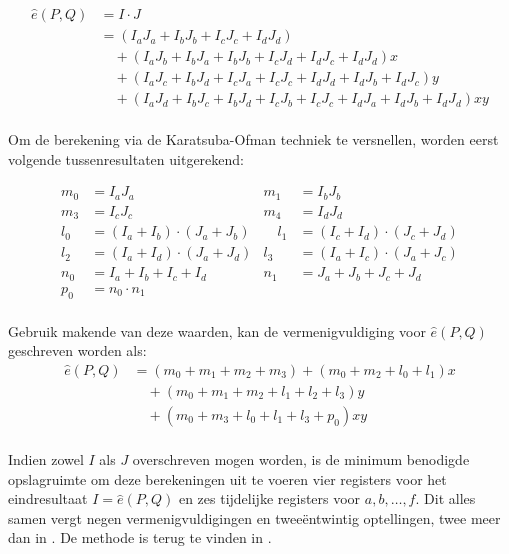 \[\begin{aligned}
\hat{e}(P, Q)	&= I \cdot J\\
	&= (I_a J_a + I_b J_b + I_c J_c + I_d J_d)\\
	&\quad + (I_a J_b + I_b J_a + I_b J_b + I_c J_d + I_d J_c + I_d J_d)x\\
	&\quad + (I_a J_c + I_b J_d + I_c J_a + I_c J_c + I_d J_d + I_d J_b + I_d J_c)y\\
	&\quad + (I_a J_d + I_b J_c + I_b J_d + I_c J_b + I_c J_c + I_d J_a + I_d J_b + I_d J_d)xy\\
\end{aligned}\]

Om de berekening via de Karatsuba-Ofman techniek te versnellen, worden eerst volgende tussenresultaten uitgerekend:

\[\begin{aligned}
m_0	&= I_a J_a
	&m_1	&= I_b J_b\\
m_3	&= I_c J_c
	&m_4	&= I_d J_d\\
l_0	&= (I_a + I_b) \cdot (J_a + J_b)
	&\quad l_1	&= (I_c + I_d) \cdot (J_c + J_d)\\
l_2	&= (I_a + I_d) \cdot (J_a + J_d)
	&l_3	&= (I_a + I_c) \cdot (J_a + J_c)\\
n_0	&= I_a + I_b + I_c + I_d
	&n_1	&= J_a + J_b + J_c + J_d\\
p_0	&= n_0 \cdot n_1\\
\end{aligned}\]

Gebruik makende van deze waarden, kan de vermenigvuldiging voor $\hat{e}(P, Q)$ geschreven worden als:
\[\begin{aligned}
\hat{e}(P, Q)	&= (m_0 + m_1 + m_2 + m_3) + (m_0 + m_2 + l_0 + l_1)x\\
	&\quad + (m_0 + m_1 + m_2 + l_1 + l_2 + l_3)y\\
	&\quad + (m_0 + m_3 + l_0 + l_1 + l_3 + p_0)xy\\
\end{aligned}\]

Indien zowel $I$ als $J$ overschreven mogen worden, is de minimum benodigde opslagruimte om deze berekeningen uit te voeren vier registers voor het eindresultaat $I = \hat{e}(P, Q)$ en zes tijdelijke registers voor $a, b, \ldots, f$. Dit alles samen vergt negen vermenigvuldigingen en twee\"entwintig optellingen, twee meer dan in \cite{beuchat}. De methode is terug te vinden in .

